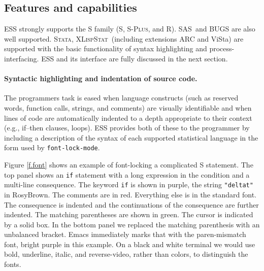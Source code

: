 \documentclass{article}
\newcommand*{\SAS}{\textsc{SAS}}
\newcommand*{\Splus}{\textsc{S-Plus}}
\newcommand*{\XLispStat}{\textsc{XLispStat}}
\newcommand*{\Stata}{\textsc{Stata}}
\newcommand{\stexttt}[1]{{\small\texttt{#1}}}
\begin{document}

\subsection{Features and capabilities}
\label{sec:ESS:features}

ESS strongly supports the S family (S, \Splus, and R)\@.  \SAS\ and BUGS
are also well supported.  \Stata, \XLispStat\ (including extensions
ARC and ViSta) are supported with the basic functionality of syntax
highlighting and process-interfacing.  ESS and its interface are fully
discussed in the next section.

\paragraph{Syntactic highlighting and indentation of source code.}
The programmers task is eased when language constructs (such as
reserved words, function calls, strings, and comments) are visually
identifiable and when lines of code are automatically indented to a
depth appropriate to their context (e.g., if--then clauses, loops).
ESS provides both of these to the programmer by
including a description of the syntax of each
supported statistical language in the form used by
\stexttt{font-lock-mode}.  

Figure \ref{f.font} shows an example of font-locking a
complicated S statement.  The top panel shows an \stexttt{if}
statement with a long expression in the condition and a multi-line
consequence.  The keyword \stexttt{if} is shown in purple,
the string \stexttt{"deltat"} in RosyBrown.  The
comments are in red.  Everything else is in the standard
font.  The consequence is indented and the continuations of the
consequence are further indented.  The matching parentheses are shown
in green.  The cursor is indicated
by a solid box.  In the bottom panel we replaced the matching
parenthesis with an unbalanced bracket.  Emacs immediately marks that
with the paren-mismatch font, bright purple in this example.
On a black and white terminal we would use bold, underline, italic,
and reverse-video, rather than colors, to distinguish the fonts.
\end{document}
